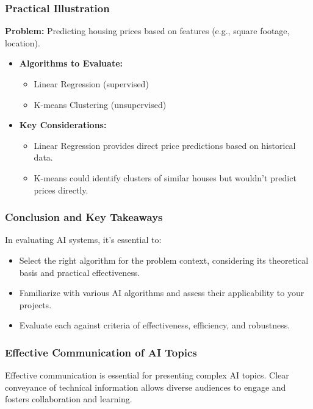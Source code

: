 \documentclass[aspectratio=169]{beamer}
\begin{document}
\begin{frame}[fragile]
    \frametitle{Practical Illustration}
    
    \textbf{Problem:} Predicting housing prices based on features (e.g., square footage, location).
    
    \begin{itemize}
        \item \textbf{Algorithms to Evaluate:} 
        \begin{itemize}
            \item Linear Regression (supervised)
            \item K-means Clustering (unsupervised)
        \end{itemize}
        
        \item \textbf{Key Considerations:} 
        \begin{itemize}
            \item Linear Regression provides direct price predictions based on historical data.
            \item K-means could identify clusters of similar houses but wouldn't predict prices directly.
        \end{itemize}
    \end{itemize}
\end{frame}

\begin{frame}[fragile]
    \frametitle{Conclusion and Key Takeaways}
    
    In evaluating AI systems, it’s essential to:
    
    \begin{itemize}
        \item Select the right algorithm for the problem context, considering its theoretical basis and practical effectiveness.
        \item Familiarize with various AI algorithms and assess their applicability to your projects.
        \item Evaluate each against criteria of effectiveness, efficiency, and robustness.
    \end{itemize}
\end{frame}

\begin{frame}[fragile]
    \frametitle{Effective Communication of AI Topics}
    Effective communication is essential for presenting complex AI topics. Clear conveyance of technical information allows diverse audiences to engage and fosters collaboration and learning.
\end{frame}
\end{document}
